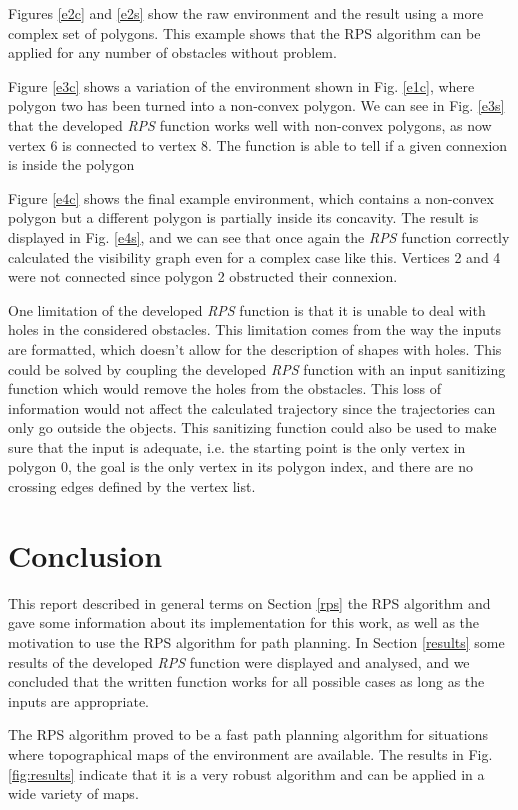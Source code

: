 \documentclass[journal]{IEEEtran}
\begin{document}
Figures \ref{e2c} and \ref{e2s} show the raw environment and the result using a more complex set of polygons. This example shows that the RPS algorithm can be applied for any number of obstacles without problem.

Figure \ref{e3c} shows a variation of the environment shown in Fig. \ref{e1c}, where polygon two has been turned into a non-convex polygon. We can see in Fig. \ref{e3s} that the developed \textit{RPS} function works well with non-convex polygons, as now vertex 6 is connected to vertex 8. The function is able to tell if a given connexion is inside the polygon 

Figure \ref{e4c} shows the final example environment, which contains a non-convex polygon but a different polygon is partially inside its concavity. The result is displayed in Fig. \ref{e4s}, and we can see that once again the \textit{RPS} function correctly calculated the visibility graph even for a complex case like this. Vertices 2 and 4 were not connected since polygon 2 obstructed their connexion.

One limitation of the developed \textit{RPS} function is that it is unable to deal with holes in the considered obstacles. This limitation comes from the way the inputs are formatted, which doesn't allow for the description of shapes with holes. This could be solved by coupling the developed \textit{RPS} function with an input sanitizing function which would remove the holes from the obstacles. This loss of information would not affect the calculated trajectory since the trajectories can only go outside the objects. This sanitizing function could also be used to make sure that the input is adequate, i.e. the starting point is the only vertex in polygon 0, the goal is the only vertex in its polygon index, and there are no crossing edges defined by the vertex list.

\section{Conclusion}\label{conclusion}

This report described in general terms on Section \ref{rps} the RPS algorithm and gave some information about its implementation for this work, as well as the motivation to use the RPS algorithm for path planning. In Section \ref{results} some results of the developed \textit{RPS} function were displayed and analysed, and we concluded that the written function works for all possible cases as long as the inputs are appropriate.

The RPS algorithm proved to be a fast path planning algorithm for situations where topographical maps of the environment are available. The results in Fig. \ref{fig:results} indicate that it is a very robust algorithm and can be applied in a wide variety of maps.



%
%
\end{document}

